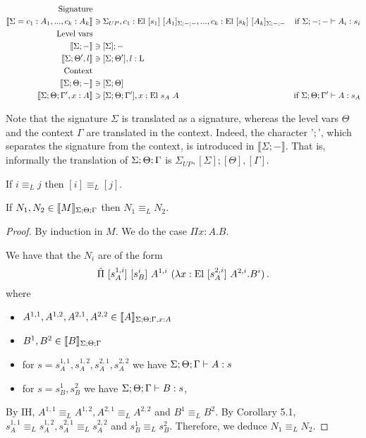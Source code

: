 \documentclass[]{StandardTemplate}
\begin{document}
\begin{align*}
  \text{Signature}& \\
  \llbracket \Sigma = c_1 : A_1, ..., c_k : A_k \rrbracket &\ni \Sigma_{UP}, c_1 : \text{El}~[s_1]~[ A_1]_{\Sigma;-;-}, ..., c_k : \text{El}~[s_k]~[ A_k]_{\Sigma;-;-}& \text{if } \Sigma;-;- \vdash A_i : s_i\\
  \text{Level vars}&\\
  \llbracket \Sigma;- \rrbracket &\ni [\Sigma]; - \\
  \llbracket   \Sigma;\Theta', l \rrbracket &\ni [\Sigma;\Theta'], l : \text{L} \\
  \text{Context}& \\
  \llbracket \Sigma;\Theta;- \rrbracket &\ni [\Sigma;\Theta] \\
  \llbracket \Sigma;\Theta;\Gamma', x : A \rrbracket &\ni [\Sigma;\Theta;\Gamma'], x : \text{El}~s_A~A & \text{if } \Sigma;\Theta;\Gamma' \vdash A : s_A
\end{align*}

Note that the signature $ \Sigma $ is translated as a signature, whereas the level vars $ \Theta $ and the context $ \Gamma $ are translated in the context. Indeed, the character '$ ; $', which separates the signature from the context, is introduced in $ \llbracket \Sigma;- \rrbracket $. That is, informally the translation of $ {\Sigma;\Theta;\Gamma} $ is $ \Sigma_{UP},[\Sigma];[\Theta],[\Gamma] $.

\begin{assumption}
If $ i \equiv_L j $ then $ [i] \equiv_L [j] $.
\end{assumption}

\begin{thm}[]
If $ N_1, N_2 \in \llbracket M \rrbracket_{\Sigma;\Theta;\Gamma}$ then $ N_1 \equiv_L N_2 $.
\end{thm}
\begin{proof}
  By induction in $ M $. We do the case $ \Pi x : A . B $. 

  We have that the $ N_i$ are of the form \[
\hat{\Pi}~ [s_A^{1,i}]~[s^i_B]~A^{1,i}~(\lambda x : \text{El}~[s_A^{2,i}]~A^{2,i}.B^i )
\,.\] where
\begin{itemize}
\item $ A^{1,1}, A^{1,2}, A^{2,1},A^{2,2} \in \llbracket A \rrbracket_{{\Sigma;\Theta;\Gamma}, x:A}$
\item $ B^1, B^2 \in \llbracket B \rrbracket_{\Sigma;\Theta;\Gamma}$  
\item for $s = s_A^{1,1}, s_A^{1,2}, s_A^{2,1}, s_A^{2,2} $ we have $ {\Sigma;\Theta;\Gamma} \vdash A : s $
\item for $s = s_B^1, s_B^2$ we have $ {\Sigma;\Theta;\Gamma} \vdash B : s $, 
\end{itemize}
  By IH, $ A^{1,1} \equiv_L A^{1,2}, A^{2,1} \equiv_L A^{2,2} $ and $ B^1 \equiv_L B^2 $. By Corollary 5.1, $ s_A^{1,1} \equiv_L s_A^{1,2}, s_A^{2,1} \equiv_L s_A^{2,2}$ and $ s_B^1 \equiv_L s_B^2 $. Therefore, we deduce $ N_1 \equiv_L N_2 $.
  
\end{proof}
\end{document}
